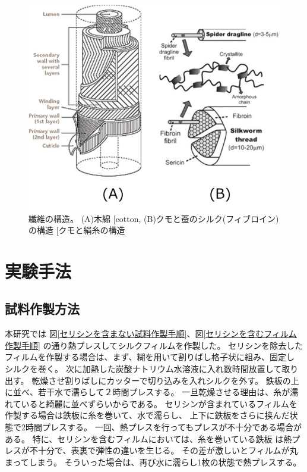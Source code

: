 \documentclass[dvipdfmx,12pt,a4paper]{jreport}
\makeatletter
\DeclareRobustCommand\cite{\unskip
    	\@ifnextchar[{\@tempswatrue\@citex}{\@tempswafalse\@citex[]}}
\makeatother
\begin{document}
			\begin{figure}[h]
				\centering
				\includegraphics[scale=0.8]{fiber_structures.jpg}
				\caption{繊維の構造。 
				(A)木綿\cite{cotton}, 
				(B)クモと蚕のシルク(フィブロイン)の構造\cite{クモと絹糸の構造}}
			\end{figure}
	\chapter{実験手法}
		\section{試料作製方法}
		本研究では
		図\ref{セリシンを含まない試料作製手順}、図\ref{セリシンを含むフィルム作製手順}
		の通り熱プレスしてシルクフィルムを作製した。
		セリシンを除去したフィルムを作製する場合は、まず、糊を用いて割りばし格子状に組み、固定し
		シルクを巻く。
		次に加熱した炭酸ナトリウム水溶液に入れ数時間放置して取り出す。
		乾燥させ割りばしにカッターで切り込みを入れシルクを外す。
		鉄板の上に並べ、若干水で濡らして２時間プレスする。
		一旦乾燥させる理由は、糸が濡れていると綺麗に並べずらいからである。
		セリシンが含まれているフィルムを作製する場合は鉄板に糸を巻いて、水で濡らし、
		上下に鉄板をさらに挟んだ状態で2時間プレスする。
		一回、熱プレスを行ってもプレスが不十分である場合がある。
		特に、セリシンを含むフィルムにおいては、糸を巻いている鉄板
		は熱プレスが不十分で、表裏で弾性の違いを生じる。
		その差が激しいとフィルムが丸まってしまう。
		そういった場合は、再び水に濡らし1枚の状態で熱プレスする。
\end{document}
